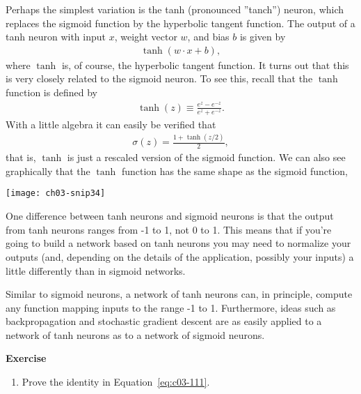 Perhaps the simplest variation is the tanh (pronounced ''tanch'') neuron, which replaces the sigmoid function by the hyperbolic tangent function. The output of a tanh neuron with input $x$, weight vector $w$, and bias $b$ is given by 
\begin{eqnarray} 
    \tanh(w \cdot x+b), 
    \label{eq:c03-109}
\end{eqnarray} 
where $\tanh$ is, of course, the hyperbolic tangent function. It turns out that this is very closely related to the sigmoid neuron. To see this, recall that the $\tanh$ function is defined by
\begin{eqnarray} 
\tanh(z) \equiv \frac{e^z-e^{-z}}{e^z+e^{-z}}. 
\label{eq:c03-110}
\end{eqnarray} 
With a little algebra it can easily be verified that 
\begin{eqnarray} 
\sigma(z) = \frac{1+\tanh(z/2)}{2}, 
\label{eq:c03-111}
\end{eqnarray} 
that is, $\tanh$ is just a rescaled version of the sigmoid function. We can also see graphically that the $\tanh$ function has the same shape as the sigmoid function,

\begin{marginfigure}
    \texttt{[image: ch03-snip34]}
    \end{marginfigure}

    
    One difference between tanh neurons and sigmoid neurons is that the output from tanh neurons ranges from -1 to 1, not 0 to 1. This means that if you're going to build a network based on tanh neurons you may need to normalize your outputs (and, depending on the details of the application, possibly your inputs) a little differently than in sigmoid networks.
    
    Similar to sigmoid neurons, a network of tanh neurons can, in principle, compute any function mapping inputs to the range -1 to 1. Furthermore, ideas such as backpropagation and stochastic gradient descent are as easily applied to a network of tanh neurons as to a network of sigmoid neurons.

\textbf{Exercise}

\begin{enumerate}
\item Prove the identity in Equation~\ref{eq:c03-111}.
\end{enumerate}    




